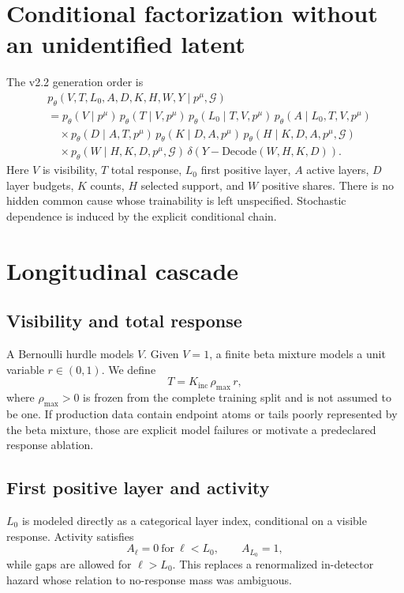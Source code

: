 \documentclass[10pt,a4paper]{article}
\newcommand{\pFour}{p^{\mu}}
\newcommand{\Kinc}{K_{\mathrm{inc}}}
\begin{document}
\section{Conditional factorization without an unidentified latent}

The v2.2 generation order is
\begin{align}
&p_\theta(V,T,L_0,A,D,K,H,W,Y\mid \pFour,\mathcal G)\\
&=p_\theta(V\mid \pFour)\,
  p_\theta(T\mid V,\pFour)\,
  p_\theta(L_0\mid T,V,\pFour)\,
  p_\theta(A\mid L_0,T,V,\pFour)\nonumber\\
&\quad\times p_\theta(D\mid A,T,\pFour)\,
  p_\theta(K\mid D,A,\pFour)\,
  p_\theta(H\mid K,D,A,\pFour,\mathcal G)\nonumber\\
&\quad\times p_\theta(W\mid H,K,D,\pFour,\mathcal G)\,
  \delta\!\left(Y-\mathrm{Decode}(W,H,K,D)\right).
\label{eq:factorization}
\end{align}
Here $V$ is visibility, $T$ total response, $L_0$ first positive layer, $A$ active layers, $D$ layer budgets, $K$ counts, $H$ selected support, and $W$ positive shares. There is no hidden common cause whose trainability is left unspecified. Stochastic dependence is induced by the explicit conditional chain.

\section{Longitudinal cascade}

\subsection{Visibility and total response}
A Bernoulli hurdle models $V$. Given $V=1$, a finite beta mixture models a unit variable $r\in(0,1)$. We define
\begin{equation}
 T=\Kinc\,\rho_{\max}\,r,
 \label{eq:response}
\end{equation}
where $\rho_{\max}>0$ is frozen from the complete training split and is not assumed to be one. If production data contain endpoint atoms or tails poorly represented by the beta mixture, those are explicit model failures or motivate a predeclared response ablation.

\subsection{First positive layer and activity}
$L_0$ is modeled directly as a categorical layer index, conditional on a visible response. Activity satisfies
\begin{equation}
 A_\ell=0\ \text{for}\ \ell<L_0,\qquad A_{L_0}=1,
\end{equation}
while gaps are allowed for $\ell>L_0$. This replaces a renormalized in-detector hazard whose relation to no-response mass was ambiguous.
\end{document}
